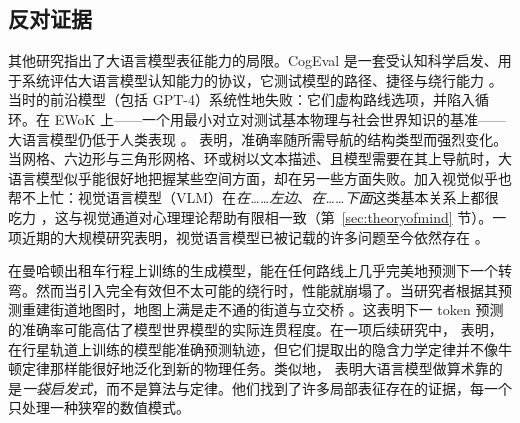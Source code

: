 \subsection{反对证据}
其他研究指出了大语言模型表征能力的局限。CogEval 是一套受认知科学启发、用于系统评估大语言模型认知能力的协议，它测试模型的路径、捷径与绕行能力 \citep{momennejad2023cogmap}。当时的前沿模型（包括 GPT-4）系统性地失败：它们虚构路线选项，并陷入循环。在 EWoK 上——一个用最小对立对测试基本物理与社会世界知识的基准——大语言模型仍低于人类表现 \citep{ivanova2025elementsworldknowledgeewok}。\citet{yamada2024spatial} 表明，准确率随所需导航的结构类型而强烈变化。当网格、六边形与三角形网格、环或树以文本描述、且模型需要在其上导航时，大语言模型似乎能很好地把握某些空间方面，却在另一些方面失败。加入视觉似乎也帮不上忙：视觉语言模型（VLM）在{\em 在……左边}、{\em 在……下面}这类基本关系上都很吃力 \citep{kamath2023whats}，这与视觉通道对心理理论帮助有限相一致（第~\ref{sec:theoryofmind} 节）。一项近期的大规模研究表明，视觉语言模型已被记载的许多问题至今依然存在 \citep{wang2026monos}。

在曼哈顿出租车行程上训练的生成模型，能在任何路线上几乎完美地预测下一个转弯。然而当引入完全有效但不太可能的绕行时，性能就崩塌了。当研究者根据其预测重建街道地图时，地图上满是走不通的街道与立交桥 \citep{vafa2024eval}。这表明下一 token 预测的准确率可能高估了模型世界模型的实际连贯程度。在一项后续研究中，\citet{vafa2025foundation} 表明，在行星轨道上训练的模型能准确预测轨迹，但它们提取出的隐含力学定律并不像牛顿定律那样能很好地泛化到新的物理任务。类似地，\citet{nikankin2025arith} 表明大语言模型做算术靠的是{\em 一袋启发式}，而不是算法与定律。他们找到了许多局部表征存在的证据，每一个只处理一种狭窄的数值模式。



